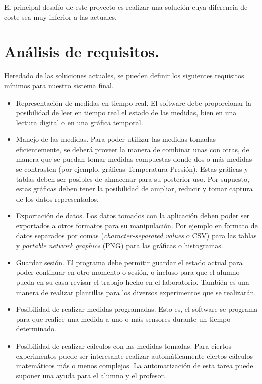 	El principal desafío de este proyecto es realizar una solución cuya diferencia de coste sea muy inferior a las actuales.

\section{Análisis de requisitos.}
		Heredado de las soluciones actuales, se pueden definir los siguientes requisitos mínimos para nuestro sistema final.
	\begin{itemize}
		\item{Representación de medidas en tiempo real. }El software debe proporcionar la posibilidad de leer en tiempo real el estado de las medidas, bien en una lectura digital o en una gráfica temporal.
		\item{Manejo de las medidas. }Para poder utilizar las medidas tomadas eficientemente, se deberá proveer la manera de combinar unas con otras, de manera que se puedan tomar medidas compuestas donde dos o más medidas se contrasten (por ejemplo, gráficas Temperatura-Presión). Estas gráficas y tablas deben ser posibles de almacenar para su posterior uso. Por supuesto, estas gráficas deben tener la posibilidad de ampliar, reducir y tomar captura de los datos representados.
		\item{Exportación de datos. }Los datos tomados con la aplicación deben poder ser exportados a otros formatos para su manipulación. Por ejemplo en formato de datos separados por comas (\emph{character-separated values} o CSV) para las tablas y \emph{portable network graphics} (PNG) para las gráficas o histogramas.
		\item{Guardar sesión. }El programa debe permitir guardar el estado actual para poder continuar en otro momento o sesión, o incluso para que el alumno pueda en su casa revisar el trabajo hecho en el laboratorio. También es una manera de realizar plantillas para los diversos experimentos que se realizarán.
		\item{Posibilidad de realizar medidas programadas.} Esto es, el software se programa para que realice una medida a uno o más sensores durante un tiempo determinado.
		\item{Posibilidad de realizar cálculos con las medidas tomadas. }Para ciertos experimentos puede ser interesante realizar automáticamente ciertos cálculos matemáticos más o menos complejos. La automatización de esta tarea puede suponer una ayuda para el alumno y el profesor.
	\end{itemize}


